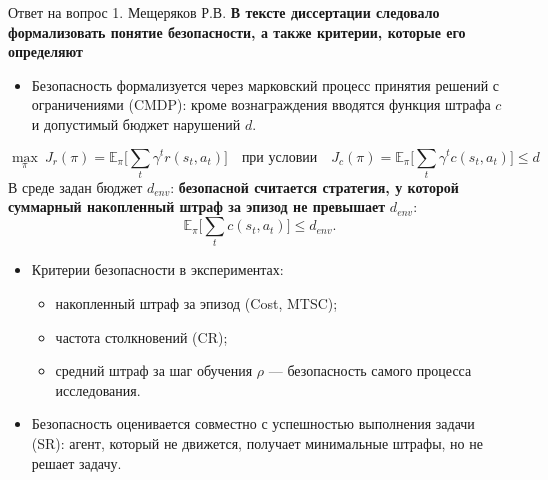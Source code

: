\begin{frame}[noframenumbering,shrink=12]{Ответ на вопрос 1. Мещеряков Р.В.}
    \small
    \textbf{В тексте диссертации следовало формализовать понятие безопасности, а также критерии, которые его определяют}

    \vspace{0.3em}
    \begin{itemize}
        \item Безопасность формализуется через марковский процесс принятия
              решений с ограничениями (CMDP): кроме вознаграждения вводятся
              функция штрафа $c$ и допустимый бюджет нарушений $d$.
    \end{itemize}
    \begin{block}{}
        \[
            \max_{\pi}\ J_r(\pi) = \mathbb{E}_\pi\Big[\sum_t \gamma^t r(s_t, a_t)\Big]
            \quad \text{при условии} \quad
            J_c(\pi) = \mathbb{E}_\pi\Big[\sum_t \gamma^t c(s_t, a_t)\Big] \le d
        \]
        В среде задан бюджет $d_{env}$: \textbf{безопасной считается стратегия,
        у которой суммарный накопленный штраф за эпизод не превышает}
        $d_{env}$:
        \[
            \mathbb{E}_\pi\Big[\sum_t c(s_t, a_t)\Big] \le d_{env}.
        \]
    \end{block}
    \begin{itemize}
        \item Критерии безопасности в экспериментах:
              \begin{itemize}
                  \item накопленный штраф за эпизод (Cost, MTSC);
                  \item частота столкновений (CR);
                  \item средний штраф за шаг обучения $\rho$ --- безопасность
                        самого процесса исследования.
              \end{itemize}
        \item Безопасность оценивается совместно с успешностью выполнения
              задачи (SR): агент, который не движется, получает минимальные
              штрафы, но не решает задачу.
    \end{itemize}
\end{frame}


